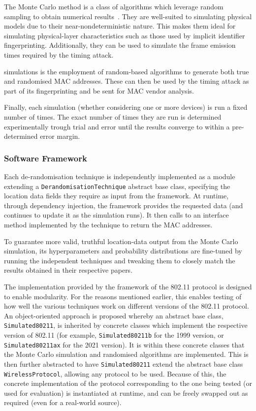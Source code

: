 The Monte Carlo method is a class of algorithms which leverage random sampling to obtain numerical results~\cite{raychaudhuri2008}.
They are well-suited to simulating physical models due to their near-nondeterministic nature.
This makes them ideal for simulating physical-layer characteristics such as those used by implicit identifier fingerprinting.
Additionally, they can be used to simulate the frame emission times required by the timing attack.

 simulations is the employment of random-based algorithms to generate both true and randomised MAC addresses.
These can then be used by the timing attack as part of its fingerprinting and be sent for MAC vendor analysis.

Finally, each simulation (whether considering one or more devices) is run a fixed number of times.
The exact number of times they are run is determined experimentally trough trial and error until the results converge to within a pre-determined error margin.

\subsubsection{Software Framework}

Each de-randomisation technique is independently implemented as a module extending a \texttt{DerandomisationTechnique} abstract base class, specifying the location data fields they require as input from the framework.
At runtime, through dependency injection, the framework provides the requested data (and continues to update it as the simulation runs).
It then calls to an interface method implemented by the technique to return the MAC addresses.

To guarantee more valid, truthful location-data output from the Monte Carlo simulation, its hyperparameters and probability distributions are fine-tuned by running the independent techniques and tweaking them to closely match the results obtained in their respective papers.

The implementation provided by the framework of the 802.11 protocol is designed to enable modularity.
For the reasons mentioned earlier, this enables testing of how well the various techniques work on different versions of the 802.11 protocol.
An object-oriented approach is proposed whereby an abstract base class, \texttt{Simulated80211}, is inherited by concrete classes which implement the respective version of 802.11 (for example, \texttt{Simulated80211b} for the 1999 version, or \texttt{Simulated80211ax} for the 2021 version).
It is within these concrete classes that the Monte Carlo simulation and randomised algorithms are implemented.
This is then further abstracted to have \texttt{Simulated80211} extend the abstract base class \texttt{WirelessProtocol}, allowing any protocol to be used.
Because of this, the concrete implementation of the protocol corresponding to the one being tested (or used for evaluation) is instantiated at runtime, and can be freely swapped out as required (even for a real-world source).

